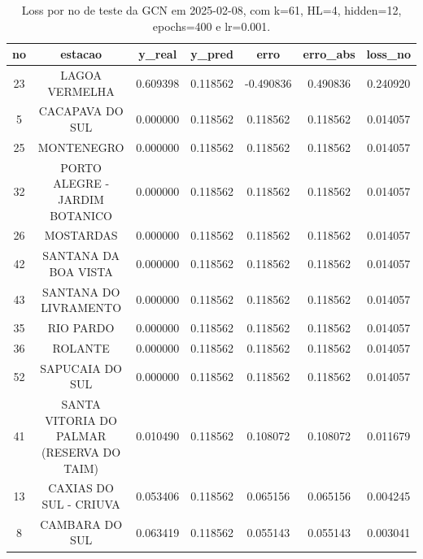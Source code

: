 \begin{table}[h]
\centering
\caption{Loss por no de teste da GCN em 2025-02-08, com k=61, HL=4, hidden=12, epochs=400 e lr=0.001.}
\label{tab:gcn_loss_k61_hl4_h12_e400_d20250208}
\begin{tabular}{ccccccc}
\toprule
no & estacao & y\_real & y\_pred & erro & erro\_abs & loss\_no \\
\midrule
23 & LAGOA VERMELHA & 0.609398 & 0.118562 & -0.490836 & 0.490836 & 0.240920 \\
5 & CACAPAVA DO SUL & 0.000000 & 0.118562 & 0.118562 & 0.118562 & 0.014057 \\
25 & MONTENEGRO & 0.000000 & 0.118562 & 0.118562 & 0.118562 & 0.014057 \\
32 & PORTO ALEGRE - JARDIM BOTANICO & 0.000000 & 0.118562 & 0.118562 & 0.118562 & 0.014057 \\
26 & MOSTARDAS & 0.000000 & 0.118562 & 0.118562 & 0.118562 & 0.014057 \\
42 & SANTANA DA BOA VISTA & 0.000000 & 0.118562 & 0.118562 & 0.118562 & 0.014057 \\
43 & SANTANA DO LIVRAMENTO & 0.000000 & 0.118562 & 0.118562 & 0.118562 & 0.014057 \\
35 & RIO PARDO & 0.000000 & 0.118562 & 0.118562 & 0.118562 & 0.014057 \\
36 & ROLANTE & 0.000000 & 0.118562 & 0.118562 & 0.118562 & 0.014057 \\
52 & SAPUCAIA DO SUL & 0.000000 & 0.118562 & 0.118562 & 0.118562 & 0.014057 \\
41 & SANTA VITORIA DO PALMAR (RESERVA DO TAIM) & 0.010490 & 0.118562 & 0.108072 & 0.108072 & 0.011679 \\
13 & CAXIAS DO SUL - CRIUVA & 0.053406 & 0.118562 & 0.065156 & 0.065156 & 0.004245 \\
8 & CAMBARA DO SUL & 0.063419 & 0.118562 & 0.055143 & 0.055143 & 0.003041 \\
\bottomrule
\end{tabular}
\end{table}
